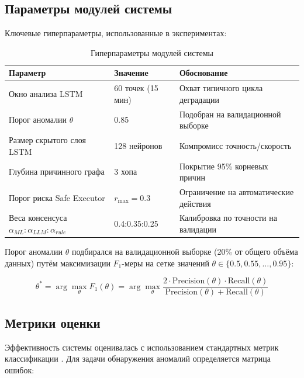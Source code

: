 \subsection{Параметры модулей системы}

Ключевые гиперпараметры, использованные в экспериментах:

\begin{table}[H]
\centering
\small
\caption{Гиперпараметры модулей системы}
\label{tab:hyperparameters}
\begin{tabular}{|p{4cm}|l|p{5cm}|}
\hline
\textbf{Параметр} & \textbf{Значение} & \textbf{Обоснование} \\
\hline
Окно анализа LSTM & 60 точек (15 мин) & Охват типичного цикла деградации \\
\hline
Порог аномалии $\theta$ & 0.85 & Подобран на валидационной выборке \\
\hline
Размер скрытого слоя LSTM & 128 нейронов & Компромисс точность/скорость \\
\hline
Глубина причинного графа & 3 хопа & Покрытие 95\% корневых причин \\
\hline
Порог риска Safe Executor & $r_{\max} = 0.3$ & Ограничение на автоматические действия \\
\hline
Веса консенсуса $\alpha_{ML}:\alpha_{LLM}:\alpha_{rule}$ & 0.4:0.35:0.25 & Калибровка по точности на валидации \\
\hline
\end{tabular}
\end{table}

Порог аномалии $\theta$ подбирался на валидационной выборке (20\% от общего объёма данных) путём максимизации $F_1$-меры на сетке значений $\theta \in \{0.5, 0.55, \ldots, 0.95\}$:

\begin{equation}
\theta^* = \arg\max_{\theta} F_1(\theta) = \arg\max_{\theta} \frac{2 \cdot \text{Precision}(\theta) \cdot \text{Recall}(\theta)}{\text{Precision}(\theta) + \text{Recall}(\theta)}
\label{eq:threshold_selection}
\end{equation}

\subsection{Метрики оценки}

Эффективность системы оценивалась с использованием стандартных метрик классификации \cite{hastie_elements,bishop_pattern_recognition}. Для задачи обнаружения аномалий определяется матрица ошибок:

